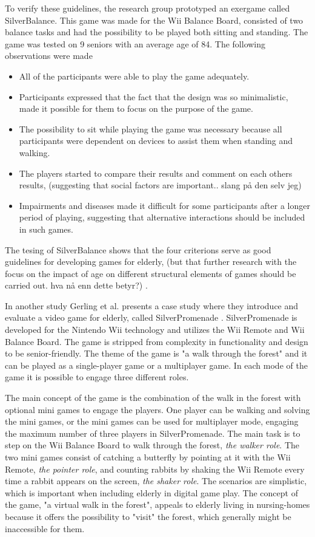 To verify these guidelines, the research group prototyped an exergame called SilverBalance. This game was made for the Wii Balance Board, consisted of two balance tasks and had the possibility to be played both sitting and standing. The game was tested on 9 seniors with an average age of 84. The following observations were made \cite{gerling1}
\begin{itemize}
\item All of the participants were able to play the game adequately. 
\item Participants expressed that the fact that the design was so minimalistic, made it possible for them to focus on the purpose of the game. 
\item The possibility to sit while playing the game was necessary because all participants were dependent on devices to assist them when standing and walking.
\item The players started to compare their results and comment on each others results, (suggesting that social factors are important.. slang på den selv jeg)
\item Impairments and diseases made it difficult for some participants after a longer period of playing, suggesting that alternative interactions should be included in such games.
\end{itemize}

The tesing of SilverBalance shows that the four criterions serve as good guidelines for developing games for elderly, (but that further research with the focus on the impact of age on different structural elements of games should be carried out. hva nå enn dette betyr?) \cite{gerling1}.

In another study Gerling et al. presents a case study where they introduce and evaluate a video game for elderly, called SilverPromenade \cite{gerling2}.  SilverPromenade is developed for the Nintendo Wii technology and utilizes the Wii Remote and Wii Balance Board. The game is stripped from complexity in functionality and design to be senior-friendly. The theme of the game is "a walk through the forest" and it can be played as a single-player game or a multiplayer game. In each mode of the game it is possible to engage three different roles.

The main concept of the game is the combination of the walk in the forest with optional mini games to engage the players. One player can be walking and solving the mini games, or the mini games can be used for multiplayer mode, engaging the maximum number of three players in SilverPromenade. The main task is to step on the Wii Balance Board to walk through the forest, \emph{the walker role}. The two mini games consist of catching a butterfly by pointing at it with the Wii Remote, \emph{the pointer role}, and counting rabbits by shaking the Wii Remote every time a rabbit appears on the screen, \emph{the shaker role}. The scenarios are simplistic, which is important when including elderly in digital game play. The concept of the game, "a virtual walk in the forest", appeals to elderly living in nursing-homes because it offers the possibility to "visit" the forest, which generally might be inaccessible for them.

